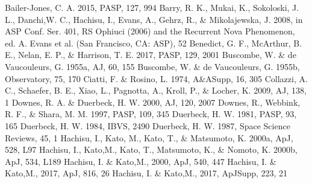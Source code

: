 \documentclass[a4paper,fleqn,usenatbib]{mnras}
\begin{document}
\begin{thebibliography}{99}
 Bailer-Jones, C. A. 2015, PASP, 127, 994
 Barry, R. K., Mukai, K., Sokoloski, J. L., Danchi,W. C., Hachisu, I., Evans, A., Gehrz, R., \& Mikolajewska, J. 2008, in ASP Conf. Ser. 401, RS Ophiuci (2006) and the Recurrent Nova Phenomenon, ed. A. Evans et al. (San Francisco, CA: ASP), 52
 Benedict, G. F., McArthur, B. E., Nelan, E. P., \& Harrison, T. E. 2017, PASP, 129, 2001
 Buscombe, W. \& de Vaucouleurs, G. 1955a, AJ, 60, 155
 Buscombe, W. \& de Vaucouleurs, G. 1955b, Observatory, 75, 170
 Ciatti, F. \& Rosino, L.  1974, A\&ASupp, 16, 305 
 Collazzi, A. C., Schaefer, B. E., Xiao, L., Pagnotta, A., Kroll, P., \& Locher, K. 2009, AJ, 138, 1 
 Downes, R. A. \& Duerbeck, H. W.  2000, AJ, 120, 2007
 Downes, R., Webbink, R. F., \& Shara, M. M. 1997, PASP, 109, 345
 Duerbeck, H. W.  1981, PASP, 93, 165
 Duerbeck, H. W.  1984, IBVS, 2490
 Duerbeck, H. W.  1987, Space Science Reviews, 45, 1
 Hachisu, I., Kato, M., Kato, T., \& Matsumoto, K. 2000a, ApJ, 528, L97
 Hachisu, I., Kato,M., Kato, T., Matsumoto, K., \& Nomoto, K. 2000b, ApJ, 534, L189
 Hachisu, I. \& Kato,M., 2000, ApJ, 540, 447
 Hachisu, I. \& Kato,M., 2017, ApJ, 816, 26
 Hachisu, I. \& Kato,M., 2017, ApJSupp, 223, 21

\end{thebibliography}
\end{document}
